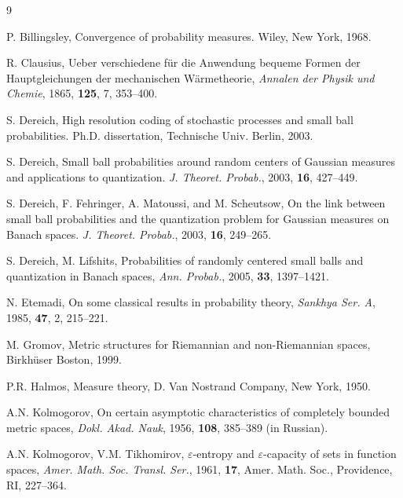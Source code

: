 \documentclass[12pt]{article}
\let\ep\varepsilon
\theoremstyle{definition}
\begin{document}
\begin{thebibliography}{9}

{\baselineskip=10pt \small


P. Billingsley,  Convergence of probability measures. Wiley, New York, 1968.

R. Clausius,  Ueber verschiedene für die Anwendung bequeme Formen der Hauptgleichungen der mechanischen W\"armetheorie, \emph{Annalen der Physik und Chemie}, 1865, {\bf 125}, 7, 353--400.

S. Dereich, High resolution coding of stochastic processes and small ball probabilities. Ph.D. dissertation, Technische Univ. Berlin, 2003.

S. Dereich,  Small ball probabilities around random centers of Gaussian measures and applications to quantization.  \emph{J. Theoret. Probab.}, 2003, {\bf 16}, 427--449.

S. Dereich, F. Fehringer, A. Matoussi, and M. Scheutsow, On the link between small ball probabilities and the quantization problem for Gaussian measures on Banach spaces. \emph{J. Theoret. Probab.}, 
2003, {\bf 16}, 249--265.

S. Dereich, M. Lifshits, Probabilities of randomly centered small balls and quantization in Banach spaces, 
\emph{Ann. Probab.}, 2005, {\bf 33}, 1397--1421.

    N. Etemadi, On some classical results in probability theory, \emph{Sankhya Ser. A}, 
    1985, {\bf 47}, 2, 215--221.

M. Gromov, Metric structures for Riemannian and non-Riemannian spaces, Birkh\"user Boston, 1999.

P.R. Halmos, Measure theory, D. Van Nostrand Company, New York, 1950.

A.N. Kolmogorov, On certain asymptotic characteristics of completely bounded metric spaces, 
\emph{Dokl. Akad. Nauk}, 1956, {\bf 108}, 385--389 (in Russian).

A.N. Kolmogorov, V.M. Tikhomirov, $\ep$-entropy and $\ep$-capacity of sets in function spaces, 
\emph{Amer. Math. Soc. Transl. Ser.}, 1961, {\bf 17}, Amer. Math. Soc., Providence, RI, 227--364.

}
\end{thebibliography}
\end{document}
